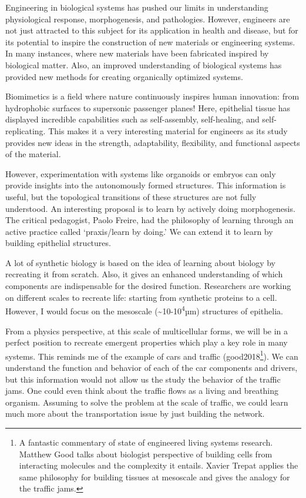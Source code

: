 \documentclass[
]{article}
\begin{document}
Engineering in biological systems has pushed our limits in understanding
physiological response, morphogenesis, and pathologies. However,
engineers are not just attracted to this subject for its application in
health and disease, but for its potential to inspire the construction of
new materials or engineering systems. In many instances, where new
materials have been fabricated inspired by biological matter. Also, an
improved understanding of biological systems has provided new methods
for creating organically optimized systems.

Biomimetics is a field where nature continuously inspires human
innovation: from hydrophobic surfaces to supersonic passenger planes!
Here, epithelial tissue has displayed incredible capabilities such as
self-assembly, self-healing, and self-replicating. This makes it a very
interesting material for engineers as its study provides new ideas in
the strength, adaptability, flexibility, and functional aspects of the
material.

However, experimentation with systems like organoids or embryos can only
provide insights into the autonomously formed structures. This
information is useful, but the topological transitions of these
structures are not fully understood. An interesting proposal is to learn
by actively doing morphogenesis. The critical pedagogist, Paolo Freire,
had the philosophy of learning through an active practice called
`praxis/learn by doing.' We can extend it to learn by building
epithelial structures.

A lot of synthetic biology is based on the idea of learning about
biology by recreating it from scratch. Also, it gives an enhanced
understanding of which components are indispensable for the desired
function. Researchers are working on different scales to recreate life:
starting from synthetic proteins to a cell. However, I would focus on
the mesoscale (\textasciitilde10-10\textsuperscript{4}µm) structures of
epithelia.

From a physics perspective, at this scale of multicellular forms, we
will be in a perfect position to recreate emergent properties which play
a key role in many systems. This reminds me of the example of cars and
traffic (good2018\footnote{A fantastic commentary of state of engineered
  living systems research. Matthew Good talks about biologist
  perspective of building cells from interacting molecules and the
  complexity it entails. Xavier Trepat applies the same philosophy for
  building tissues at mesoscale and gives the analogy for the traffic
  jams.}). We can understand the function and behavior of each of the
car components and drivers, but this information would not allow us the
study the behavior of the traffic jams. One could even think about the
traffic flows as a living and breathing organism. Assuming to solve the
problem at the scale of traffic, we could learn much more about the
transportation issue by just building the network.
\end{document}

